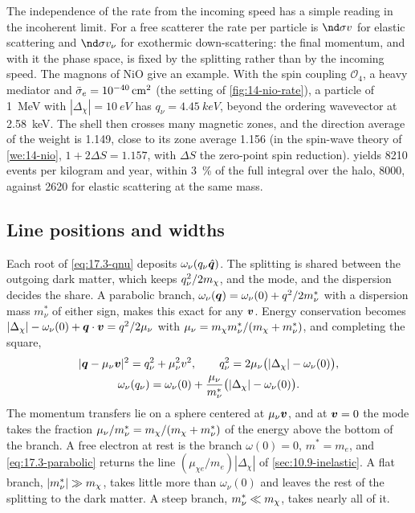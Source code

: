 The independence of the rate from the incoming speed has a simple reading in the incoherent limit. For a free scatterer the rate per particle is $\nd\sigma v$ for elastic scattering and $\nd\sigma v_\nu$ for exothermic down-scattering: the final momentum, and with it the phase space, is fixed by the splitting rather than by the incoming speed. The magnons of NiO give an example. With the spin coupling $\mathcal{O}_4$, a heavy mediator and $\bar{\sigma}_{e} = \SI{e-40}{cm^2}$ (the setting of \cref{fig:14-nio-rate}), a particle of \SI{1}{MeV} with $|\Delta_\chi| = \SI{10}{eV}$ has $q_\nu = \SI{4.45}{keV}$, beyond the ordering wavevector at \SI{2.58}{keV}. The shell then crosses many magnetic zones, and the direction average of the weight is 1.149, close to its zone average 1.156 (in the spin-wave theory of \cref{we:14-nio}, $1 + 2\Delta S = 1.157$, with $\Delta S$ the zero-point spin reduction).  yields 8210 events per kilogram and year, within \SI{3}{\percent} of the full integral over the halo, 8000, against 2620 for elastic scattering at the same mass.

\subsection{Line positions and widths}\label{sec:17.3-lines}

Each root of \cref{eq:17.3-qnu} deposits $\omega_\nu(q_\nu\hat{\bm{q}})$. The splitting is shared between the outgoing dark matter, which keeps $q_\nu^2/2m_{\chi}$, and the mode, and the dispersion decides the share. A parabolic branch, $\omega_\nu(\bm{q}) = \omega_\nu(0) + q^2/2m^*_\nu$ with a dispersion mass $m^*_\nu$ of either sign, makes this exact for any $\bm{v}$. Energy conservation becomes $|\Delta_\chi| - \omega_\nu(0) + \bm{q}\cdot\bm{v} = q^2/2\mu_\nu$ with $\mu_\nu = m_{\chi} m^*_\nu/(m_{\chi} + m^*_\nu)$, and completing the square,
\begin{gather}
  |\bm{q} - \mu_\nu\bm{v}|^2 = q_\nu^2 + \mu_\nu^2v^2 , \qquad
  q_\nu^2 = 2\mu_\nu\bigl(|\Delta_\chi| - \omega_\nu(0)\bigr) , \notag\\
  \omega_\nu(q_\nu) = \omega_\nu(0) + \frac{\mu_\nu}{m^*_\nu}\bigl(|\Delta_\chi| - \omega_\nu(0)\bigr) .
  \label{eq:17.3-parabolic}
\end{gather}
The momentum transfers lie on a sphere centered at $\mu_\nu\bm{v}$, and at $\bm{v} = 0$ the mode takes the fraction $\mu_\nu/m^*_\nu = m_{\chi}/(m_{\chi} + m^*_\nu)$ of the energy above the bottom of the branch. A free electron at rest is the branch $\omega(0) = 0$, $m^* = m_e$, and \cref{eq:17.3-parabolic} returns the line $(\mu_{\chi e}/m_e)|\Delta_\chi|$ of \cref{sec:10.9-inelastic}. A flat branch, $|m^*_\nu| \gg m_{\chi}$, takes little more than $\omega_\nu(0)$ and leaves the rest of the splitting to the dark matter. A steep branch, $m^*_\nu \ll m_{\chi}$, takes nearly all of it.

